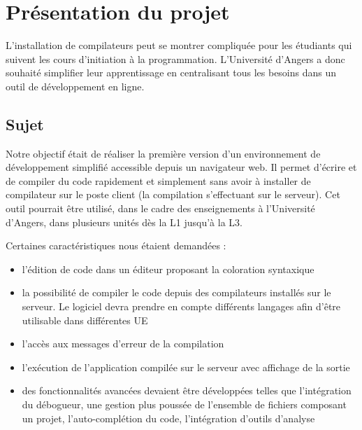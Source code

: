 \chapter{Présentation du projet}

\par L'installation de compilateurs peut se montrer compliquée pour les étudiants qui suivent les cours d'initiation à la programmation. L'Université d'Angers a donc souhaité simplifier leur apprentissage en centralisant tous les besoins dans un outil de développement en ligne.

\section{Sujet}

\par Notre objectif était de réaliser la première version d'un environnement de développement simplifié accessible depuis un navigateur web. Il permet d'écrire et de compiler du code rapidement et simplement sans avoir à installer de compilateur sur le poste client (la compilation s'effectuant sur le serveur). Cet outil pourrait être utilisé, dans le cadre des enseignements à l'Université d'Angers, dans plusieurs unités dès la L1 jusqu'à la L3. \\

\par Certaines caractéristiques nous étaient demandées :

\begin{itemize}

	\item l'édition de code dans un éditeur proposant la coloration syntaxique
	\item la possibilité de compiler le code depuis des compilateurs installés sur le serveur. Le logiciel devra prendre en compte différents langages afin d’être utilisable dans différentes UE
	\item l'accès aux messages d'erreur de la compilation
	\item l'exécution de l'application compilée sur le serveur avec affichage de la sortie
	\item des fonctionnalités avancées devaient être développées telles que l’intégration du débogueur, une gestion plus poussée de l’ensemble de fichiers composant un projet, l'auto-complétion du code, l'intégration d’outils d’analyse

\end{itemize}



